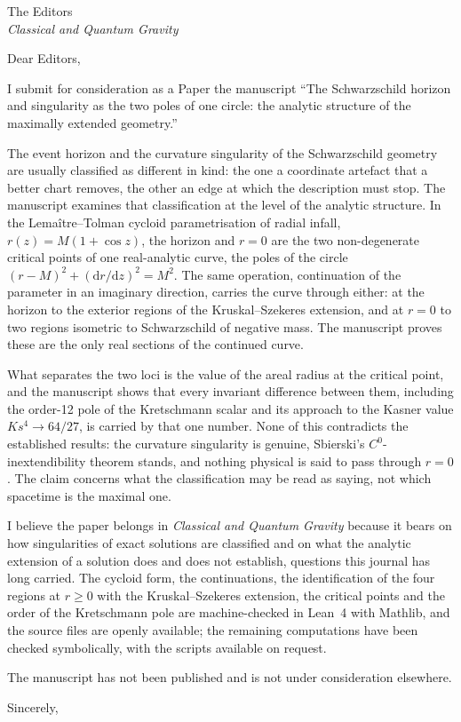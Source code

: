 \documentclass[11pt]{letter}
\date{\today}
\newcommand{\dd}{\mathrm{d}}
\begin{document}
\begin{letter}{The Editors\\
\textit{Classical and Quantum Gravity}}

\opening{Dear Editors,}

I submit for consideration as a Paper the manuscript ``The Schwarzschild horizon and singularity as the two poles of one circle: the analytic structure of the maximally extended geometry.''

The event horizon and the curvature singularity of the Schwarzschild geometry are usually classified as different in kind: the one a coordinate artefact that a better chart removes, the other an edge at which the description must stop. The manuscript examines that classification at the level of the analytic structure. In the Lema\^itre--Tolman cycloid parametrisation of radial infall, $r(z)=M(1+\cos z)$, the horizon and $r=0$ are the two non-degenerate critical points of one real-analytic curve, the poles of the circle $(r-M)^2+(\dd r/\dd z)^2=M^2$. The same operation, continuation of the parameter in an imaginary direction, carries the curve through either: at the horizon to the exterior regions of the Kruskal--Szekeres extension, and at $r=0$ to two regions isometric to Schwarzschild of negative mass. The manuscript proves these are the only real sections of the continued curve.

What separates the two loci is the value of the areal radius at the critical point, and the manuscript shows that every invariant difference between them, including the order-12 pole of the Kretschmann scalar and its approach to the Kasner value $Ks^4\to64/27$, is carried by that one number. None of this contradicts the established results: the curvature singularity is genuine, Sbierski's $C^0$-inextendibility theorem stands, and nothing physical is said to pass through $r=0$. The claim concerns what the classification may be read as saying, not which spacetime is the maximal one.

I believe the paper belongs in \textit{Classical and Quantum Gravity} because it bears on how singularities of exact solutions are classified and on what the analytic extension of a solution does and does not establish, questions this journal has long carried. The cycloid form, the continuations, the identification of the four regions at $r\geq0$ with the Kruskal--Szekeres extension, the critical points and the order of the Kretschmann pole are machine-checked in Lean~4 with Mathlib, and the source files are openly available; the remaining computations have been checked symbolically, with the scripts available on request.

The manuscript has not been published and is not under consideration elsewhere.

\closing{Sincerely,}

\end{letter}
\end{document}
